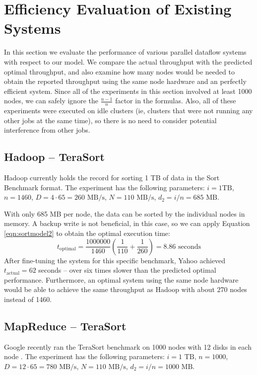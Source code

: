 \documentclass[ 11pt, letterpaper]{article}%
\begin{document}
\section{Efficiency Evaluation of Existing Systems}

In this section we evaluate the performance of various parallel dataflow
systems with respect to our model. We compare the actual throughput with the
predicted optimal throughput, and also examine how many nodes would be needed
to obtain the reported throughput using the same node hardware and an perfectly
efficient system. Since all of the experiments in this section involved at least
1000 nodes, we can safely ignore the $\frac{n-1}{n}$ factor in the formulas. Also, all of these experiments
were executed on idle clusters (ie, clusters that were not running any other
jobs at the same time), so there is no need to consider potential interference
from other jobs.

\subsection{Hadoop -- TeraSort}

Hadoop currently holds the record \cite{hadoop2009} for sorting 1 TB of data in
the Sort Benchmark \cite{sortbenchmark} format. The experiment has the
following parameters: $i = 1 \text{
TB}$, $n = 1460$, $D = 4 \cdot 65 = 260 \text{ MB/s}$, $N = 110 \text{ MB/s}$, $d_2 = i/n = 685 \text{ MB}$.

With only 685 MB per node, the data can be sorted by the individual nodes in memory. A backup write is not beneficial, in this case, so we can apply Equation \ref{eqn:sortmodel2} to obtain the optimal execution time:
\[t_\text{optimal} = \frac{1000000}{1460} \left( \frac{1}{110} + \frac{1}{260}
\right) = 8.86 \text{ seconds}\]
After fine-tuning the system for this specific
benchmark, Yahoo achieved $t_\text{actual} = 62$ seconds -- over six times
slower than the predicted optimal performance. Furthermore, an optimal system
using the same node hardware would be able to achieve the same throughput as Hadoop
with about 270 nodes instead of 1460.

\subsection{MapReduce -- TeraSort}

Google recently ran the TeraSort benchmark on 1000 nodes with
12 disks in each node \cite{sorting1pb}. The experiment has the following
parameters: $i = 1 \text{ TB}$, $n = 1000$, $D = 12 \cdot 65 = 780 \text{ MB/s}$, $N = 110 \text{ MB/s}$, $d_2 = i/n = 1000 \text{ MB}$.
\end{document}
